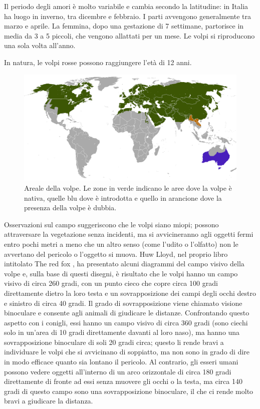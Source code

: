 \documentclass[11pt]{article}
\begin{document}
Il periodo degli amori è molto variabile e cambia secondo la latitudine: in Italia ha luogo in inverno, tra dicembre e febbraio. I parti avvengono generalmente tra marzo e aprile. La femmina, dopo una gestazione di 7 settimane, partorisce in media da 3 a 5 piccoli, che vengono allattati per un mese. Le volpi si riproducono una sola volta all'anno. 

In natura, le volpi rosse possono raggiungere l'età di 12 anni.

\begin{figure}[h]
    \centering
    \includegraphics[scale = 0.3]{ArealeDellaVolpe.png}
    \caption{Areale della volpe. Le zone in verde indicano le aree dove la volpe è nativa, quelle blu dove è introdotta e quello in arancione dove la presenza della volpe è dubbia. }
    \label{figArealeVolpe}
\end{figure}

Osservazioni sul campo\cite{RedFox} suggeriscono che le volpi siano miopi; possono attraversare la vegetazione senza incidenti, ma si avvicineranno agli oggetti fermi entro pochi metri a meno che un altro senso (come l'udito o l'olfatto) non le avvertano del pericolo o l'oggetto si muova. Huw Lloyd, nel proprio libro intitolato The red fox \cite{Zimen1980}, ha presentato alcuni diagrammi del campo visivo della volpe e, sulla base di questi disegni, è risultato che le volpi hanno un campo visivo di circa 260 gradi, con un punto cieco che copre circa 100 gradi direttamente dietro la loro testa e un sovrapposizione dei campi degli occhi destro e sinistro di circa 40 gradi. Il grado di sovrapposizione viene chiamato visione binoculare e consente agli animali di giudicare le distanze.
Confrontando questo aspetto con i conigli, essi hanno un campo visivo di circa 360 gradi (sono ciechi solo in un'area di 10 gradi direttamente davanti al loro naso), ma hanno una sovrapposizione binoculare di soli 20 gradi circa; questo li rende bravi a individuare le volpi che si avvicinano di soppiatto, ma non sono in grado di dire in modo efficace quanto sia lontano il pericolo. Al contrario, gli esseri umani possono vedere oggetti all'interno di un arco orizzontale di circa 180 gradi direttamente di fronte ad essi senza muovere gli occhi o la testa, ma circa 140 gradi di questo campo sono una sovrapposizione binoculare, il che ci rende molto bravi a giudicare la distanza.
\end{document}
